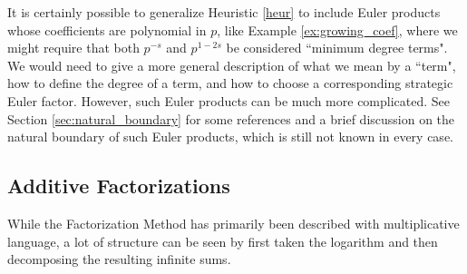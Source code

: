 \documentclass[12pt]{amsart}
\theoremstyle{plain}
\begin{document}
It is certainly possible to generalize Heuristic \ref{heur} to include Euler products whose coefficients are polynomial in $p$, like Example \ref{ex:growing_coef}, where we might require that both $p^{-s}$ and $p^{1-2s}$ be considered ``minimum degree terms". We would need to give a more general description of what we mean by a ``term", how to define the degree of a term, and how to choose a corresponding strategic Euler factor. However, such Euler products can be much more complicated. See Section \ref{sec:natural_boundary} for some references and a brief discussion on the natural boundary of such Euler products, which is still not known in every case.






\subsection{Additive Factorizations}

While the Factorization Method has primarily been described with multiplicative language, a lot of structure can be seen by first taken the logarithm and then decomposing the resulting infinite sums.
\end{document}
